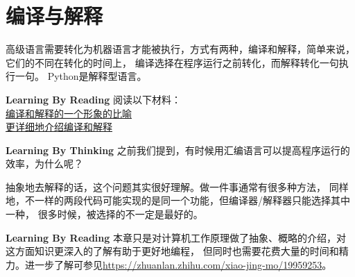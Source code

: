 \section{编译与解释}
高级语言需要转化为机器语言才能被执行，方式有两种，编译和解释，简单来说，它们的不同在转化的时间上，
编译选择在程序运行之前转化，而解释转化一句执行一句。
Python是解释型语言。
\begin{paperbox}{\textbf{Learning By Reading}\starthree}
阅读以下材料：\\
\href{https://www.zhihu.com/question/21486706/answer/32975999}{编译和解释的一个形象的比喻}\\
\href{http://alexyyek.github.io/2015/01/08/CompileAndInterpreter/}{更详细地介绍编译和解释}
\end{paperbox}
\begin{paperbox}{\textbf{Learning By Thinking}\starthree}
之前我们提到，有时候用汇编语言可以提高程序运行的效率，为什么呢？
\end{paperbox}
抽象地去解释的话，这个问题其实很好理解。做一件事通常有很多种方法，
同样地，不一样的两段代码可能实现的是同一个功能，但编译器/解释器只能选择其中一种，
很多时候，被选择的不一定是最好的。
\begin{paperbox}{\textbf{Learning By Reading}\starone}
本章只是对计算机工作原理做了抽象、概略的介绍，对这方面知识更深入的了解有助于更好地编程，
但同时也需要花费大量的时间和精力。进一步了解可参见\url{https://zhuanlan.zhihu.com/xiao-jing-mo/19959253}。
\end{paperbox}

